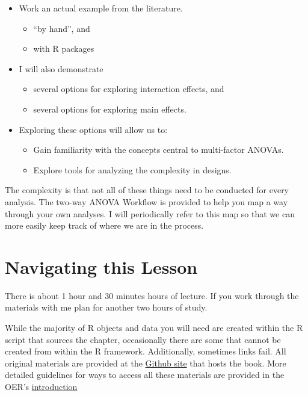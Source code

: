 \documentclass[
  11pt,
]{book}
\providecommand{\tightlist}{%
  \setlength{\itemsep}{0pt}\setlength{\parskip}{0pt}}
\begin{document}
\begin{itemize}
\tightlist
\item
  Work an actual example from the literature.

  \begin{itemize}
  \tightlist
  \item
    ``by hand'', and
  \item
    with R packages
  \end{itemize}
\item
  I will also demonstrate

  \begin{itemize}
  \tightlist
  \item
    several options for exploring interaction effects, and
  \item
    several options for exploring main effects.
  \end{itemize}
\item
  Exploring these options will allow us to:

  \begin{itemize}
  \tightlist
  \item
    Gain familiarity with the concepts central to multi-factor ANOVAs.
  \item
    Explore tools for analyzing the complexity in designs.
  \end{itemize}
\end{itemize}

The complexity is that not all of these things need to be conducted for every analysis. The two-way ANOVA Workflow is provided to help you map a way through your own analyses. I will periodically refer to this map so that we can more easily keep track of where we are in the process.

\hypertarget{navigating-this-lesson-6}{%
\section{Navigating this Lesson}\label{navigating-this-lesson-6}}

There is about 1 hour and 30 minutes hours of lecture. If you work through the materials with me plan for another two hours of study.

While the majority of R objects and data you will need are created within the R script that sources the chapter, occasionally there are some that cannot be created from within the R framework. Additionally, sometimes links fail. All original materials are provided at the \href{https://github.com/lhbikos/ReCenterPsychStats}{Github site} that hosts the book. More detailed guidelines for ways to access all these materials are provided in the OER's \protect\hyperlink{ReCintro}{introduction}
\end{document}
